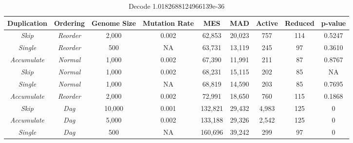 \documentclass[journal]{IEEEtran}
\begin{document}
\begin{table*}
	\centering
	\begin{tabular}{|c|c|c|c|c|c|c|c|c|}
	  \hline
\textbf{Duplication} & \textbf{Ordering} & \textbf{Genome Size} & \textbf{Mutation Rate} & \textbf{MES} & \textbf{MAD} & \textbf{Active} & \textbf{Reduced} & \textbf{p-value} \\ \hline
\emph{Skip} & \emph{Reorder}       &  2,000 & 0.002 &  62,853 & 20,023 &   757 & 114 & 0.5247 \\ \hline
\emph{Single} & \emph{Reorder}     &    500 &    NA &  63,731 & 13,119 &   245 &  97 & 0.3610 \\ \hline
\emph{Accumulate} & \emph{Normal}  &  1,000 & 0.002 &  67,390 & 11,991 &   211 &  87 & 0.8767 \\ \hline
\rowcolor{Gray}
\emph{Skip} & \emph{Normal}        &  1,000 & 0.002 &  68,231 & 15,115 &   202 &  85 & NA \\ \hline
\emph{Single} & \emph{Normal}      &  1,000 &    NA &  68,819 & 14,590 &   203 &  85 & 0.7695 \\ \hline
\emph{Accumulate} & \emph{Reorder} &  2,000 & 0.002 &  72,991 & 18,650 &   760 & 115 & 0.1868 \\ \hline
\emph{Skip} & \emph{Dag}           & 10,000 & 0.001 & 132,821 & 29,432 & 4,983 & 125 & 0 \\ \hline
\emph{Accumulate} & \emph{Dag}     &  5,000 & 0.002 & 133,188 & 29,326 & 2,542 & 125 & 0 \\ \hline
\emph{Single} & \emph{Dag}         &    500 &    NA & 160,696 & 39,242 &   299 &  97 & 0 \\ \hline
	\end{tabular}
	\caption{Decode 1.0182688124966139e-36}
	\label{tab:decode}
\end{table*}
\end{document}
